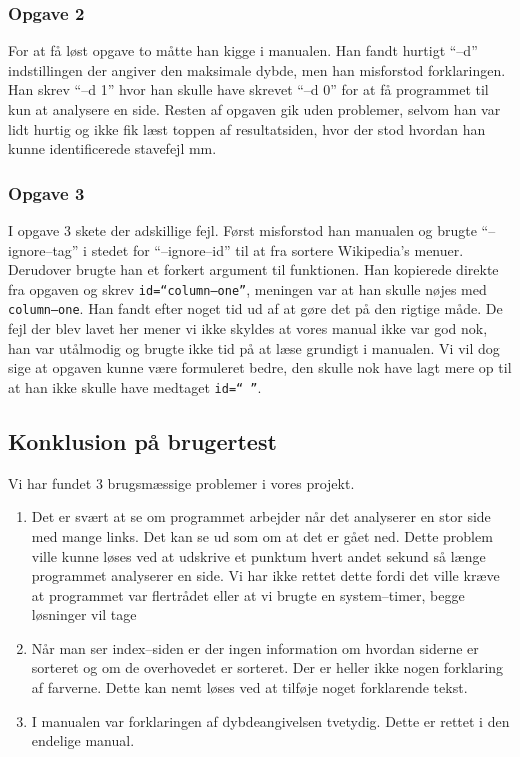 \documentclass[a4paper,oneside]{memoir}
\begin{document}
\subsubsection{Opgave 2}
For at få løst opgave to måtte han kigge i manualen. Han fandt hurtigt
``--d'' indstillingen der angiver den maksimale dybde, men han
misforstod forklaringen. Han skrev ``--d 1'' hvor han skulle have
skrevet ``--d 0'' for at få programmet til kun at analysere en side.
Resten af opgaven gik uden problemer, selvom han var lidt hurtig og
ikke fik læst toppen af resultatsiden, hvor der stod hvordan han kunne
identificerede stavefejl mm.

\subsubsection{Opgave 3}
I opgave 3 skete der adskillige fejl. Først misforstod han manualen og
brugte ``--ignore--tag'' i stedet for ``--ignore--id'' til at fra
sortere Wikipedia's menuer. Derudover brugte han et forkert argument
til funktionen. Han kopierede direkte fra opgaven og skrev
\texttt{id=``column--one''}, meningen var at han skulle nøjes med
\texttt{column--one}. Han fandt efter noget tid ud af at gøre det på
den rigtige måde. De fejl der blev lavet her mener vi ikke skyldes at
vores manual ikke var god nok, han var utålmodig og brugte ikke tid på
at læse grundigt i manualen. Vi vil dog sige at opgaven kunne være
formuleret bedre, den skulle nok have lagt mere op til at han ikke
skulle have medtaget \texttt{id=`` ''}.

\subsection{Konklusion på brugertest}
Vi har fundet 3 brugsmæssige problemer i vores projekt.
\begin{enumerate}
\item Det er svært at se om programmet arbejder når det analyserer en
  stor side med mange links. Det kan se ud som om at det er gået
  ned. Dette problem ville kunne løses ved at udskrive et punktum
  hvert andet sekund så længe programmet analyserer en side. Vi har
  ikke rettet dette fordi det ville kræve at programmet var flertrådet
  eller at vi brugte en system--timer, begge løsninger vil tage
\item Når man ser index--siden er der ingen information om hvordan
  siderne er sorteret og om de overhovedet er sorteret. Der er heller
  ikke nogen forklaring af farverne. Dette kan nemt løses ved at
  tilføje noget forklarende tekst.
\item I manualen var forklaringen af dybdeangivelsen tvetydig. Dette
  er rettet i den endelige manual.
\end{enumerate}
\end{document}
